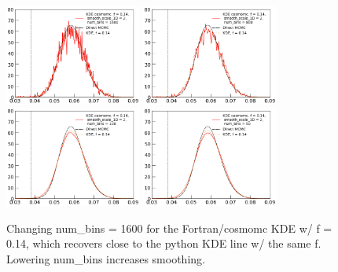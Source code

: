 \documentclass[prd,amsmath,amssymb,floatfix,superscriptaddress,nofootinbib]{revtex4-1}
\begin{document}
\begin{figure}
\includegraphics[width=0.4\textwidth]{cosmomc_kde/getdist_smoothing_test/pl18_relike_tanh_tau_dz0p5_1D_smooth_scale_1D_2_num_bins_1D_1600.png}
\includegraphics[width=0.4\textwidth]{cosmomc_kde/getdist_smoothing_test/pl18_relike_tanh_tau_dz0p5_1D_smooth_scale_1D_2_num_bins_1D_800.png}
\includegraphics[width=0.4\textwidth]{cosmomc_kde/getdist_smoothing_test/pl18_relike_tanh_tau_dz0p5_1D_smooth_scale_1D_2_num_bins_1D_100.png}
\includegraphics[width=0.4\textwidth]{cosmomc_kde/getdist_smoothing_test/pl18_relike_tanh_tau_dz0p5_1D_smooth_scale_1D_2_num_bins_1D_50.png}
\label{fig:}
\caption{Changing num\_bins = 1600 for the Fortran/cosmomc KDE w/ f = 0.14, which recovers close to the python KDE line w/ the same f. Lowering num\_bins increases smoothing.
} 
\end{figure}
\end{document}
